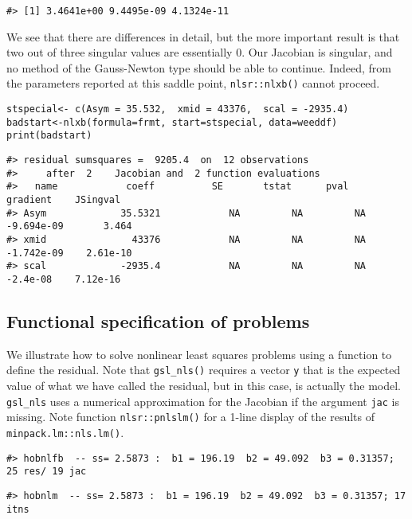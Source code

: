 \begin{verbatim}
#> [1] 3.4641e+00 9.4495e-09 4.1324e-11
\end{verbatim}

We see that there are differences in detail, but the more important result is that
two out of three singular values are essentially 0. Our Jacobian is singular, and no
method of the Gauss-Newton type should be able to continue. Indeed, from the parameters
reported at this saddle point, \texttt{nlsr::nlxb()} cannot proceed.

\begin{verbatim}
stspecial<- c(Asym = 35.532,  xmid = 43376,  scal = -2935.4)
badstart<-nlxb(formula=frmt, start=stspecial, data=weeddf)
print(badstart)
\end{verbatim}

\begin{verbatim}
#> residual sumsquares =  9205.4  on  12 observations
#>     after  2    Jacobian and  2 function evaluations
#>   name            coeff          SE       tstat      pval      gradient    JSingval   
#> Asym             35.5321            NA         NA         NA  -9.694e-09       3.464  
#> xmid               43376            NA         NA         NA  -1.742e-09    2.61e-10  
#> scal             -2935.4            NA         NA         NA    -2.4e-08    7.12e-16
\end{verbatim}

\hypertarget{functional-specification-of-problems}{%
\subsection{Functional specification of problems}\label{functional-specification-of-problems}}

We illustrate how to solve nonlinear least squares problems using
a function to define the residual. Note that \texttt{gsl\_nls()} requires
a vector \texttt{y} that is the expected value of what we have called the
residual, but in this case, is actually the model. \texttt{gsl\_nls} uses
a numerical approximation for the Jacobian if the argument \texttt{jac}
is missing. Note function \texttt{nlsr::pnlslm()} for a 1-line display of
the results of \texttt{minpack.lm::nls.lm()}.

\begin{verbatim}
#> hobnlfb  -- ss= 2.5873 :  b1 = 196.19  b2 = 49.092  b3 = 0.31357; 25 res/ 19 jac
\end{verbatim}

\begin{verbatim}
#> hobnlm  -- ss= 2.5873 :  b1 = 196.19  b2 = 49.092  b3 = 0.31357; 17  itns
\end{verbatim}

